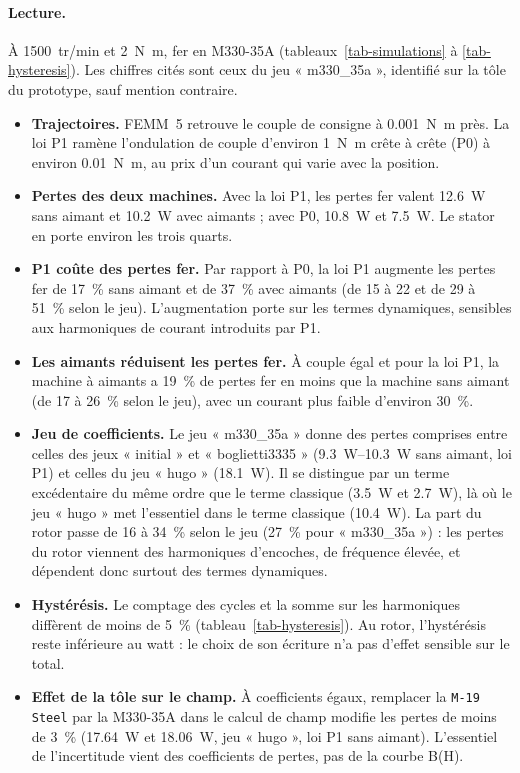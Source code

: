 \documentclass[11pt,a4paper]{article}
\begin{document}
\paragraph{Lecture.} À \SI{1500}{tr/min} et \SI{2}{\newton\metre}, fer en M330-35A (tableaux~\ref{tab-simulations} à \ref{tab-hysteresis}). Les chiffres cités sont ceux du jeu « m330\_35a », identifié sur la tôle du prototype, sauf mention contraire.
\begin{itemize}
    \item \textbf{Trajectoires.} FEMM~5 retrouve le couple de consigne à \SI{0.001}{\newton\metre} près. La loi P1 ramène l'ondulation de couple d'environ \SI{1}{\newton\metre} crête à crête (P0) à environ \SI{0.01}{\newton\metre}, au prix d'un courant qui varie avec la position.
    \item \textbf{Pertes des deux machines.} Avec la loi P1, les pertes fer valent \SI{12.6}{\watt} sans aimant et \SI{10.2}{\watt} avec aimants ; avec P0, \SI{10.8}{\watt} et \SI{7.5}{\watt}. Le stator en porte environ les trois quarts.
    \item \textbf{P1 coûte des pertes fer.} Par rapport à P0, la loi P1 augmente les pertes fer de \SI{17}{\percent} sans aimant et de \SI{37}{\percent} avec aimants (de 15 à 22 et de 29 à \SI{51}{\percent} selon le jeu). L'augmentation porte sur les termes dynamiques, sensibles aux harmoniques de courant introduits par P1.
    \item \textbf{Les aimants réduisent les pertes fer.} À couple égal et pour la loi P1, la machine à aimants a \SI{19}{\percent} de pertes fer en moins que la machine sans aimant (de 17 à \SI{26}{\percent} selon le jeu), avec un courant plus faible d'environ \SI{30}{\percent}.
    \item \textbf{Jeu de coefficients.} Le jeu « m330\_35a » donne des pertes comprises entre celles des jeux « initial » et « boglietti3335 » (\SIrange{9.3}{10.3}{\watt} sans aimant, loi P1) et celles du jeu « hugo » (\SI{18.1}{\watt}). Il se distingue par un terme excédentaire du même ordre que le terme classique (\SI{3.5}{\watt} et \SI{2.7}{\watt}), là où le jeu « hugo » met l'essentiel dans le terme classique (\SI{10.4}{\watt}). La part du rotor passe de 16 à \SI{34}{\percent} selon le jeu (\SI{27}{\percent} pour « m330\_35a ») : les pertes du rotor viennent des harmoniques d'encoches, de fréquence élevée, et dépendent donc surtout des termes dynamiques.
    \item \textbf{Hystérésis.} Le comptage des cycles et la somme sur les harmoniques diffèrent de moins de \SI{5}{\percent} (tableau~\ref{tab-hysteresis}). Au rotor, l'hystérésis reste inférieure au watt : le choix de son écriture n'a pas d'effet sensible sur le total.
    \item \textbf{Effet de la tôle sur le champ.} À coefficients égaux, remplacer la \texttt{M-19 Steel} par la M330-35A dans le calcul de champ modifie les pertes de moins de \SI{3}{\percent} (\SI{17.64}{\watt} et \SI{18.06}{\watt}, jeu « hugo », loi P1 sans aimant). L'essentiel de l'incertitude vient des coefficients de pertes, pas de la courbe B(H).
\end{itemize}
\end{document}
